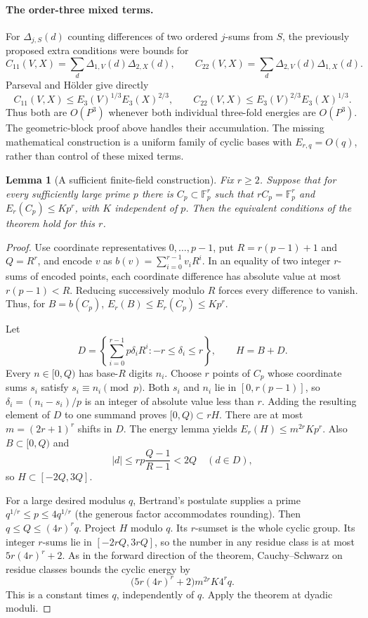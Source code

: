 \documentclass[11pt]{article}
\newtheorem{lemma}{Lemma}
\begin{document}
\paragraph{The order-three mixed terms.}
For $\Delta_{j,S}(d)$ counting differences of two ordered $j$-sums from $S$,
the previously proposed extra conditions were bounds for
\[
 C_{11}(V,X)=\sum_d\Delta_{1,V}(d)\Delta_{2,X}(d),\qquad
 C_{22}(V,X)=\sum_d\Delta_{2,V}(d)\Delta_{1,X}(d).
\]
Parseval and H\"older give directly
\[
 C_{11}(V,X)\le E_3(V)^{1/3}E_3(X)^{2/3},\qquad
 C_{22}(V,X)\le E_3(V)^{2/3}E_3(X)^{1/3}.
\]
Thus both are $O(P^3)$ whenever both individual three-fold energies are
$O(P^3)$. The geometric-block proof above handles their accumulation.
The missing mathematical construction is a uniform family of cyclic bases
with $E_{r,q}=O(q)$, rather than control of these mixed terms.

\begin{lemma}[A sufficient finite-field construction]
Fix $r\ge2$. Suppose that for every sufficiently large prime $p$ there is
$C_p\subset\mathbb F_p^r$ such that $rC_p=\mathbb F_p^r$ and
$E_r(C_p)\le Kp^r$, with $K$ independent of $p$. Then the equivalent
conditions of the theorem hold for this $r$.
\end{lemma}
\begin{proof}
Use coordinate representatives $0,\ldots,p-1$, put $R=r(p-1)+1$ and
$Q=R^r$, and encode $v$ as $b(v)=\sum_{i=0}^{r-1}v_iR^i$. In an equality
of two integer $r$-sums of encoded points, each coordinate difference has
absolute value at most $r(p-1)<R$. Reducing successively modulo $R$ forces
every difference to vanish. Thus, for $B=b(C_p)$,
$E_r(B)\le E_r(C_p)\le Kp^r$.

Let
\[
 D=\left\{\sum_{i=0}^{r-1}p\delta_iR^i:
                 -r\le\delta_i\le r\right\},\qquad H=B+D.
\]
Every $n\in[0,Q)$ has base-$R$ digits $n_i$. Choose $r$ points of $C_p$
whose coordinate sums $s_i$ satisfy $s_i\equiv n_i\pmod p$.
Both $s_i$ and $n_i$ lie in $[0,r(p-1)]$, so
$\delta_i=(n_i-s_i)/p$ is an integer of absolute value less than $r$.
Adding the resulting element of $D$ to one summand proves $[0,Q)\subset rH$.
There are at most $m=(2r+1)^r$ shifts in $D$. The energy lemma yields
$E_r(H)\le m^{2r}Kp^r$. Also $B\subset[0,Q)$ and
\[
 |d|\le rp\frac{Q-1}{R-1}<2Q\quad(d\in D),
\]
so $H\subset[-2Q,3Q]$.

For a large desired modulus $q$, Bertrand's postulate supplies a prime
$q^{1/r}\le p\le4q^{1/r}$ (the generous factor accommodates rounding).
Then $q\le Q\le(4r)^rq$. Project $H$ modulo $q$. Its $r$-sumset is the
whole cyclic group. Its integer $r$-sums lie in $[-2rQ,3rQ]$, so the
number in any residue class is at most $5r(4r)^r+2$. As in the forward
direction of the theorem, Cauchy--Schwarz on residue classes bounds the
cyclic energy by
\[
 \bigl(5r(4r)^r+2\bigr)m^{2r}K4^r q.
\]
This is a constant times $q$, independently of $q$. Apply the theorem at
dyadic moduli.
\end{proof}
\end{document}
